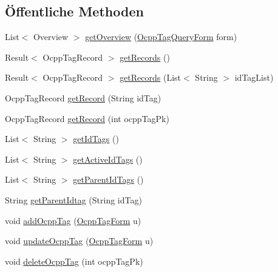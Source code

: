 \subsection*{Öffentliche Methoden}
\begin{DoxyCompactItemize}
\item 
List$<$ Overview $>$ \hyperlink{classde_1_1rwth_1_1idsg_1_1steve_1_1repository_1_1impl_1_1_ocpp_tag_repository_impl_a688e43d3667acc869ebd7f6359011b28}{get\-Overview} (\hyperlink{classde_1_1rwth_1_1idsg_1_1steve_1_1web_1_1dto_1_1_ocpp_tag_query_form}{Ocpp\-Tag\-Query\-Form} form)
\item 
Result$<$ Ocpp\-Tag\-Record $>$ \hyperlink{classde_1_1rwth_1_1idsg_1_1steve_1_1repository_1_1impl_1_1_ocpp_tag_repository_impl_a905a2e78dcec705657016087341d221b}{get\-Records} ()
\item 
Result$<$ Ocpp\-Tag\-Record $>$ \hyperlink{classde_1_1rwth_1_1idsg_1_1steve_1_1repository_1_1impl_1_1_ocpp_tag_repository_impl_ad6513629f3bf08efae3f302a60add971}{get\-Records} (List$<$ String $>$ id\-Tag\-List)
\item 
Ocpp\-Tag\-Record \hyperlink{classde_1_1rwth_1_1idsg_1_1steve_1_1repository_1_1impl_1_1_ocpp_tag_repository_impl_ae56b2cfc6b5569cb8c25212de8f363e2}{get\-Record} (String id\-Tag)
\item 
Ocpp\-Tag\-Record \hyperlink{classde_1_1rwth_1_1idsg_1_1steve_1_1repository_1_1impl_1_1_ocpp_tag_repository_impl_a3b50434992d0490662f02671e1cff32d}{get\-Record} (int ocpp\-Tag\-Pk)
\item 
List$<$ String $>$ \hyperlink{classde_1_1rwth_1_1idsg_1_1steve_1_1repository_1_1impl_1_1_ocpp_tag_repository_impl_a4ab56b2439f3d4f20962c226e63bd629}{get\-Id\-Tags} ()
\item 
List$<$ String $>$ \hyperlink{classde_1_1rwth_1_1idsg_1_1steve_1_1repository_1_1impl_1_1_ocpp_tag_repository_impl_a4cb6ba60fcdf09e6729cf714c8b30404}{get\-Active\-Id\-Tags} ()
\item 
List$<$ String $>$ \hyperlink{classde_1_1rwth_1_1idsg_1_1steve_1_1repository_1_1impl_1_1_ocpp_tag_repository_impl_adb54bd4db91e514f8e29671ef947479c}{get\-Parent\-Id\-Tags} ()
\item 
String \hyperlink{classde_1_1rwth_1_1idsg_1_1steve_1_1repository_1_1impl_1_1_ocpp_tag_repository_impl_a2c6e3dfbac92093e958cfa8bc57c7002}{get\-Parent\-Idtag} (String id\-Tag)
\item 
void \hyperlink{classde_1_1rwth_1_1idsg_1_1steve_1_1repository_1_1impl_1_1_ocpp_tag_repository_impl_a0cd4e9d5a7abb93ffc4a9505e1acf499}{add\-Ocpp\-Tag} (\hyperlink{classde_1_1rwth_1_1idsg_1_1steve_1_1web_1_1dto_1_1_ocpp_tag_form}{Ocpp\-Tag\-Form} u)
\item 
void \hyperlink{classde_1_1rwth_1_1idsg_1_1steve_1_1repository_1_1impl_1_1_ocpp_tag_repository_impl_aef18f57eb52378f4f574ced78da2b501}{update\-Ocpp\-Tag} (\hyperlink{classde_1_1rwth_1_1idsg_1_1steve_1_1web_1_1dto_1_1_ocpp_tag_form}{Ocpp\-Tag\-Form} u)
\item 
void \hyperlink{classde_1_1rwth_1_1idsg_1_1steve_1_1repository_1_1impl_1_1_ocpp_tag_repository_impl_a408f2831841f5c7c14bd410959b829bb}{delete\-Ocpp\-Tag} (int ocpp\-Tag\-Pk)
\end{DoxyCompactItemize}


